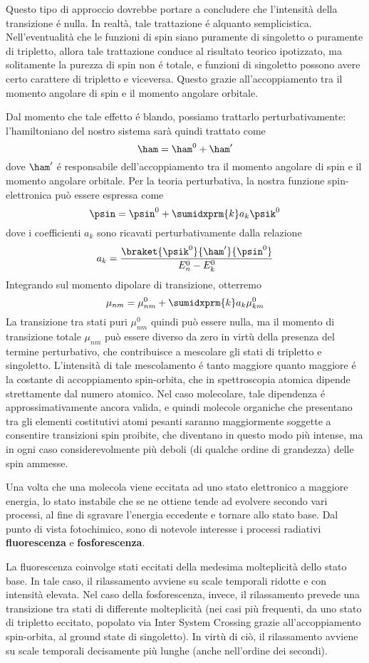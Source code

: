 Questo tipo di approccio dovrebbe portare a concludere che l'intensit\`a della
transizione \'e nulla. In realt\`a, tale trattazione \'e alquanto semplicistica. 
Nell'eventualit\`a che le funzioni di spin siano puramente di singoletto o 
puramente di tripletto, allora tale trattazione conduce al risultato
teorico ipotizzato, ma solitamente la purezza di spin non \'e totale, e 
funzioni di singoletto possono avere certo carattere di tripletto e 
viceversa. Questo grazie all'accoppiamento tra il momento angolare di 
spin e il momento angolare orbitale.

Dal momento che tale effetto \'e blando, possiamo trattarlo
perturbativamente: l'hamiltoniano del nostro sistema sar\`a quindi
trattato come 
$$
\ham = \ham^0 + \ham'
$$
dove $\ham'$ \'e responsabile dell'accoppiamento tra il momento angolare
di spin e il momento angolare orbitale. Per la teoria perturbativa, la
nostra funzione spin-elettronica pu\`o essere espressa come 
$$
\psin = \psin^0 + \sumidxprm{k} a_k \psik^0 
$$
dove i coefficienti $a_k$ sono ricavati perturbativamente dalla
relazione
$$
a_k = \frac{\braket{\psik^0}{\ham'}{\psin^0}}{E_n^0-E_k^0}
$$
Integrando sul momento dipolare di transizione, otterremo
$$
\mu_{nm} = \mu_{nm}^0 + \sumidxprm{k}a_k\mu_{km}^0
$$
La transizione tra stati puri $\mu_{nm}^0$ quindi pu\`o essere nulla, ma
il momento di transizione totale $\mu_{nm}$ pu\`o essere diverso da zero
in virt\`u della presenza del termine perturbativo, che contribuisce a
mescolare gli stati di tripletto e singoletto. L'intensit\`a di tale
mescolamento \'e tanto maggiore quanto maggiore \'e la costante di
accoppiamento spin-orbita, che in spettroscopia atomica dipende
strettamente dal numero atomico. Nel caso molecolare, tale dipendenza \'e
approssimativamente ancora valida, e quindi molecole organiche che presentano 
tra gli elementi costitutivi atomi pesanti saranno maggiormente soggette a
consentire transizioni spin proibite, che diventano in questo modo pi\`u
intense, ma in ogni caso considerevolmente pi\`u deboli (di qualche
ordine di grandezza) delle spin ammesse.

Una volta che una molecola viene eccitata ad uno stato elettronico a maggiore
energia, lo stato instabile che se ne ottiene tende ad evolvere
secondo vari processi, al fine di sgravare l'energia eccedente e tornare
allo stato base. Dal punto di vista fotochimico, sono di notevole
interesse i processi radiativi \textbf{fluorescenza} e
\textbf{fosforescenza}.

La fluorescenza coinvolge stati eccitati della medesima molteplicit\`a
dello stato base. In tale caso, il rilassamento avviene su scale
temporali ridotte e con intensit\`a elevata.
Nel caso della fosforescenza, invece, il rilassamento prevede una
transizione tra stati di differente molteplicit\`a (nei casi pi\`u
frequenti, da uno stato di tripletto eccitato, popolato via Inter System
Crossing grazie all'accoppiamento spin-orbita, al ground state di
singoletto). In virt\`u di ci\`o, il rilassamento avviene su scale
temporali decisamente pi\`u lunghe (anche nell'ordine dei secondi).

